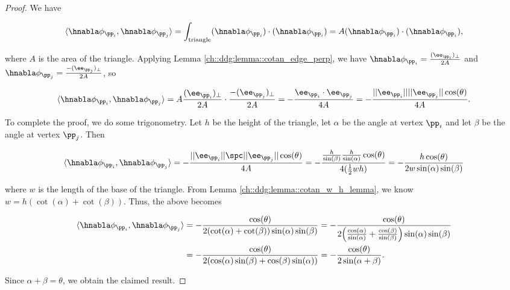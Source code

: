 \begin{proof}
    We have
    
    \begin{align*}
        \langle \hnabla \phi_{\pp_i}, \hnabla \phi_{\pp_j} \rangle
        = \int_{\text{triangle}} (\hnabla \phi_{\pp_i}) \cdot (\hnabla \phi_{\pp_i})
        = A (\hnabla \phi_{\pp_i}) \cdot (\hnabla \phi_{\pp_i}),
    \end{align*}
    
    where $A$ is the area of the triangle. Applying Lemma \ref{ch::ddg:lemma::cotan_edge_perp}, we have $\hnabla \phi_{\pp_i} = \frac{(\ee_{\pp_i})_\perp}{2A}$ and $\hnabla \phi_{\pp_j} = \frac{-(\ee_{\pp_j})_\perp}{2A}$, so
    
    \begin{align*}
        \langle \hnabla \phi_{\pp_i}, \hnabla \phi_{\pp_j} \rangle
        = A \frac{(\ee_{\pp_i})_\perp}{2A} \cdot \frac{-(\ee_{\pp_j})_\perp}{2A}
        = -\frac{\ee_{\pp_i} \cdot \ee_{\pp_j}}{4A}
        = -\frac{||\ee_{\pp_i}|| ||\ee_{\pp_j}|| \cos(\theta)}{4A}.
    \end{align*}
    
    To complete the proof, we do some trigonometry. Let $h$ be the height of the triangle, let $\alpha$ be the angle at vertex $\pp_i$ and let $\beta$ be the angle at vertex $\pp_j$. Then
    
    \begin{align*}
        \langle \hnabla \phi_{\pp_i}, \hnabla \phi_{\pp_j} \rangle
        = -\frac{||\ee_{\pp_i}|| \spc ||\ee_{\pp_j}|| \cos(\theta)}{4A}
        = -\frac{\frac{h}{\sin(\beta)} \frac{h}{\sin(\alpha)} \cos(\theta)}{4(\frac{1}{2}wh)}
        = -\frac{h \cos(\theta)}{2w\sin(\alpha)\sin(\beta)}
    \end{align*}
    
    where $w$ is the length of the base of the triangle. From Lemma \ref{ch::ddg:lemma::cotan_w_h_lemma}, we know ${w = h(\cot(\alpha) + \cot(\beta))}$. Thus, the above becomes
    
    \begin{align*}
        \langle \hnabla \phi_{\pp_i}, \hnabla \phi_{\pp_j} \rangle
        &= -\frac{\cos(\theta)}{2(\cot(\alpha) + \cot(\beta))\sin(\alpha)\sin(\beta)}
        = -\frac{\cos(\theta)}{2 \Big( \frac{\cos(\alpha)}{\sin(\alpha)} + \frac{\cos(\beta)}{\sin(\beta)}\Big) \sin(\alpha)\sin(\beta)} \\
        &= - \frac{\cos(\theta)}{2(\cos(\alpha) \sin(\beta) + \cos(\beta) \sin(\alpha))} = -\frac{\cos(\theta)}{2\sin(\alpha + \beta)}.
    \end{align*}
    
    Since $\alpha + \beta = \theta$, we obtain the claimed result. 
\end{proof}

